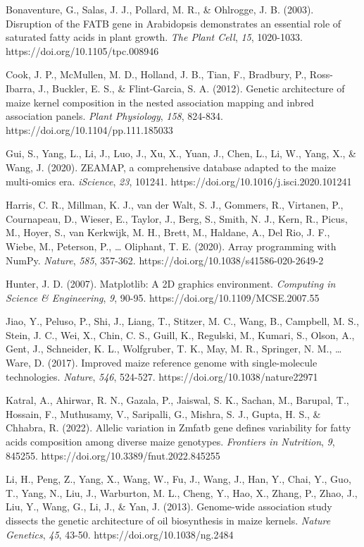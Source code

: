\documentclass[
]{article}
\begin{document}
Bonaventure, G., Salas, J. J., Pollard, M. R., \& Ohlrogge, J. B.
(2003). Disruption of the FATB gene in Arabidopsis demonstrates an
essential role of saturated fatty acids in plant growth. \emph{The Plant
Cell}, \emph{15}, 1020-1033. https://doi.org/10.1105/tpc.008946

Cook, J. P., McMullen, M. D., Holland, J. B., Tian, F., Bradbury, P.,
Ross-Ibarra, J., Buckler, E. S., \& Flint-Garcia, S. A. (2012). Genetic
architecture of maize kernel composition in the nested association
mapping and inbred association panels. \emph{Plant Physiology},
\emph{158}, 824-834. https://doi.org/10.1104/pp.111.185033

Gui, S., Yang, L., Li, J., Luo, J., Xu, X., Yuan, J., Chen, L., Li, W.,
Yang, X., \& Wang, J. (2020). ZEAMAP, a comprehensive database adapted
to the maize multi-omics era. \emph{iScience}, \emph{23}, 101241.
https://doi.org/10.1016/j.isci.2020.101241

Harris, C. R., Millman, K. J., van der Walt, S. J., Gommers, R.,
Virtanen, P., Cournapeau, D., Wieser, E., Taylor, J., Berg, S., Smith,
N. J., Kern, R., Picus, M., Hoyer, S., van Kerkwijk, M. H., Brett, M.,
Haldane, A., Del Rio, J. F., Wiebe, M., Peterson, P., \ldots{} Oliphant,
T. E. (2020). Array programming with NumPy. \emph{Nature}, \emph{585},
357-362. https://doi.org/10.1038/s41586-020-2649-2

Hunter, J. D. (2007). Matplotlib: A 2D graphics environment.
\emph{Computing in Science \& Engineering}, \emph{9}, 90-95.
https://doi.org/10.1109/MCSE.2007.55

Jiao, Y., Peluso, P., Shi, J., Liang, T., Stitzer, M. C., Wang, B.,
Campbell, M. S., Stein, J. C., Wei, X., Chin, C. S., Guill, K.,
Regulski, M., Kumari, S., Olson, A., Gent, J., Schneider, K. L.,
Wolfgruber, T. K., May, M. R., Springer, N. M., \ldots{} Ware, D.
(2017). Improved maize reference genome with single-molecule
technologies. \emph{Nature}, \emph{546}, 524-527.
https://doi.org/10.1038/nature22971

Katral, A., Ahirwar, R. N., Gazala, P., Jaiswal, S. K., Sachan, M.,
Barupal, T., Hossain, F., Muthusamy, V., Saripalli, G., Mishra, S. J.,
Gupta, H. S., \& Chhabra, R. (2022). Allelic variation in Zmfatb gene
defines variability for fatty acids composition among diverse maize
genotypes. \emph{Frontiers in Nutrition}, \emph{9}, 845255.
https://doi.org/10.3389/fnut.2022.845255

Li, H., Peng, Z., Yang, X., Wang, W., Fu, J., Wang, J., Han, Y., Chai,
Y., Guo, T., Yang, N., Liu, J., Warburton, M. L., Cheng, Y., Hao, X.,
Zhang, P., Zhao, J., Liu, Y., Wang, G., Li, J., \& Yan, J. (2013).
Genome-wide association study dissects the genetic architecture of oil
biosynthesis in maize kernels. \emph{Nature Genetics}, \emph{45}, 43-50.
https://doi.org/10.1038/ng.2484
\end{document}
